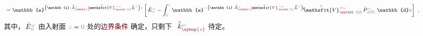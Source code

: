 \begin{align}
	&= \mathbb{e}^{\left( \mathbb{i} \xint{\begin{smallmatrix} ~ \\ {}^{}_{\mathcolor{gray}{-}} \\ ~ \end{smallmatrix}}{15}{\bar{\bar{k}}}_{\textcolor{Maroon}{\symup{z}}}^{\;\! \mathcolor{gray}{\omega}} - \xint{\mathcolor{gray}{-}}{25}{\bar{\bar{\mathsfit{V}}}}^{\;\! - \mathcolor{gray}{\omega}}_{\textcolor{Maroon}{\mathbb{1}}} \xint{\mathcolor{gray}{-}}{32}{\bar{\bar{L}}}^{\;\! \mathcolor{gray}{\omega}} \right) \mathcolor{gray}{z}} \left[ \xint{\mathcolor{gray}{-}}{295}{\bar{E}}^{\;\!\mathcolor{gray}{\omega}}_{\;\! \mathcolor{gray}{0}} - \int_{\mathcolor{gray}{0}}^{\mathcolor{gray}{z}} \mathbb{e}^{- \left( \mathbb{i} \xint{\begin{smallmatrix} ~ \\ {}^{}_{\mathcolor{gray}{-}} \\ ~ \end{smallmatrix}}{15}{\bar{\bar{k}}}_{\textcolor{Maroon}{\symup{z}}}^{\;\! \mathcolor{gray}{\omega}} - \xint{\mathcolor{gray}{-}}{25}{\bar{\bar{\mathsfit{V}}}}^{\;\! - \mathcolor{gray}{\omega}}_{\textcolor{Maroon}{\mathbb{1}}} \xint{\mathcolor{gray}{-}}{32}{\bar{\bar{L}}}^{\;\! \mathcolor{gray}{\omega}} \right) \mathcolor{gray}{\mathtt{z}}} \cdot \xint{\mathcolor{gray}{-}}{25}{\bar{\bar{\mathsfit{V}}}}^{\;\! - \mathcolor{gray}{\omega}}_{\textcolor{Maroon}{\mathbb{1}}} \xint{\mathcolor{gray}{-}}{30}{\bar{P}}^{\;\! \mathcolor{gray}{\omega}}_{\;\! \mathcolor{gray}{\mathtt{z}} \textcolor{Maroon}{(2)}} ~\mathbb{d} \mathcolor{gray}{\mathtt{z}} \right] ~, \label{eq:simplify6-SVA-E'-V_1nonsingular-solution}
\end{align}
其中，$\xint{\mathcolor{gray}{-}}{25}{\bar{E}}^{\;\!\mathcolor{gray}{\omega}}_{\;\! \mathcolor{gray}{0}}$ 由入射面 $\mathcolor{gray}{z \mathcolor{black}{=} 0}$ 处的\textcolor{Maroon}{边界条件}  确定，只剩下 $\xint{\begin{smallmatrix} ~ \\ {}^{}_{\mathcolor{gray}{-}} \\ ~ \end{smallmatrix}}{15}{\bar{\bar{k}}}_{\textcolor{Maroon}{\symup{z}}}^{\;\! \mathcolor{gray}{\omega}}$ 待定。

